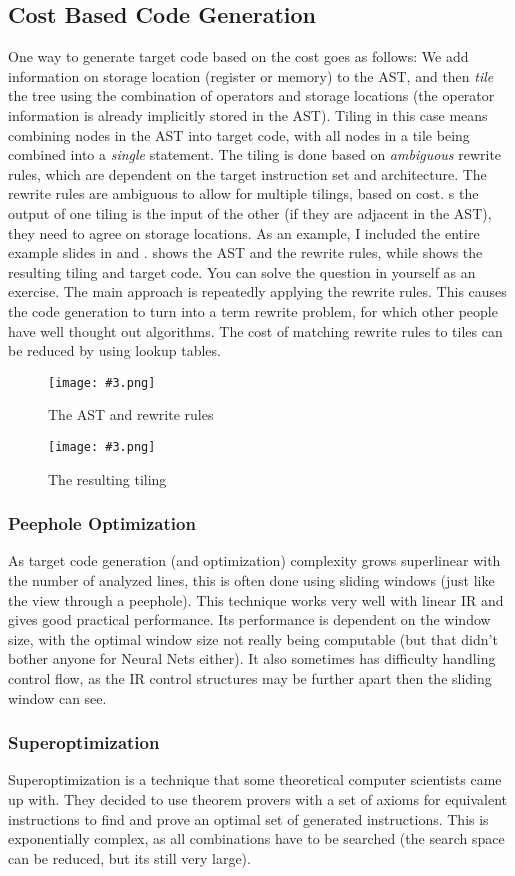 \documentclass{article}
\newcommand{\fig}[4]{
	\begin{figure}[#1]
		\center
		\texttt{[image: \#3.png]}
		\caption{#4}
		\label{fig:#3}
	\end{figure}
	}
\begin{document}
\subsection{Cost Based Code Generation}
One way to generate target code based on the cost goes as follows:
We add information on storage location (register or memory) to the AST, and then \emph{tile} the tree using the combination of operators and storage locations (the operator information is already implicitly stored in the AST).
Tiling in this case means combining nodes in the AST into target code, with all nodes in a tile being combined into a \emph{single} statement.
The tiling is done based on \emph{ambiguous} rewrite rules, which are dependent on the target instruction set and architecture.
The rewrite rules are ambiguous to allow for multiple tilings, based on cost.
s the output of one tiling is the input of the other (if they are adjacent in the AST), they need to agree on storage locations.
As an example, I included the entire example slides in  and .
 shows the AST and the rewrite rules, while  shows the resulting tiling and target code.
You can solve the question in  yourself as an exercise.
The main approach is repeatedly applying the rewrite rules.
This causes the code generation to turn into a term rewrite problem, for which other people have well thought out algorithms.
The cost of matching rewrite rules to tiles can be reduced by using lookup tables.

\fig{h}{}{slideast}{The AST and rewrite rules}

\fig{h}{}{slidetiling}{The resulting tiling}

\subsubsection{Peephole Optimization}
As target code generation (and optimization) complexity grows superlinear with the number of analyzed lines, this is often done using sliding windows (just like the view through a peephole).
This technique works very well with linear IR and gives good practical performance.
Its performance is dependent on the window size, with the optimal window size not really being computable (but that didn't bother anyone for Neural Nets either).
It also sometimes has difficulty handling control flow, as the IR control structures may be further apart then the sliding window can see.

\subsubsection{Superoptimization}
Superoptimization is a technique that some theoretical computer scientists came up with.
They decided to use theorem provers with a set of axioms for equivalent instructions to find and prove an optimal set of generated instructions.
This is exponentially complex, as all combinations have to be searched (the search space can be reduced, but its still very large).
\end{document}
